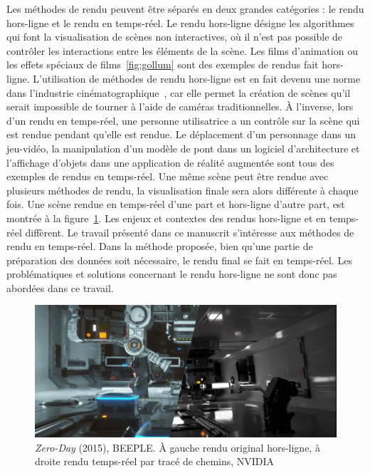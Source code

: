 Les méthodes de rendu peuvent être séparés en deux grandes catégories : le rendu hors-ligne et le rendu en temps-réel. Le rendu hors-ligne désigne les algorithmes qui font la visualisation de scènes non interactives, où il n'est pas possible de contrôler les interactions entre les éléments de la scène. Les films d'animation ou les effets spéciaux de films~\ref{fig:gollum} sont des exemples de rendus fait hors-ligne. L'utilisation de méthodes de rendu hors-ligne est en fait devenu une norme dans l'industrie cinématographique~\cite{media_history_2021}, car elle permet la création de scènes qu'il serait impossible de tourner à l'aide de caméras traditionnelles. À l'inverse, lors d'un rendu en temps-réel, une personne utilisatrice a un contrôle sur la scène qui est rendue pendant qu'elle est rendue. Le déplacement d'un personnage dans un jeu-vidéo, la manipulation d'un modèle de pont dans un logiciel d'architecture et l'affichage d'objets dans une application de réalité augmentée sont tous des exemples de rendus en temps-réel. Une même scène peut être rendue avec plusieurs méthodes de rendu, la visualisation finale sera alors différente à chaque fois. Une scène rendue en temps-réel d'une part et hors-ligne d'autre part, est montrée à la figure~\ref{fig:zero-day}. Les enjeux et contextes des rendus hors-ligne et en temps-réel diffèrent. Le travail présenté dans ce manuscrit s'intéresse aux méthodes de rendu en temps-réel. Dans la méthode proposée, bien qu'une partie de préparation des données soit nécessaire, le rendu final se fait en temps-réel. Les problématiques et solutions concernant le rendu hors-ligne ne sont donc pas abordées dans ce travail.

\bigskip

\begin{figure}[h]
    \centering
    \includegraphics[width=\textwidth]{contenu/resources/images/zero_day_comparison}
    \caption[{\it Zero-Day} (2015), BEEPLE]{{\it Zero-Day} (2015), BEEPLE. À gauche rendu original hors-ligne, à droite rendu temps-réel par tracé de chemins, NVIDIA~\cite{winkelman_zero-day_2019}}
    \label{fig:zero-day}
\end{figure}

